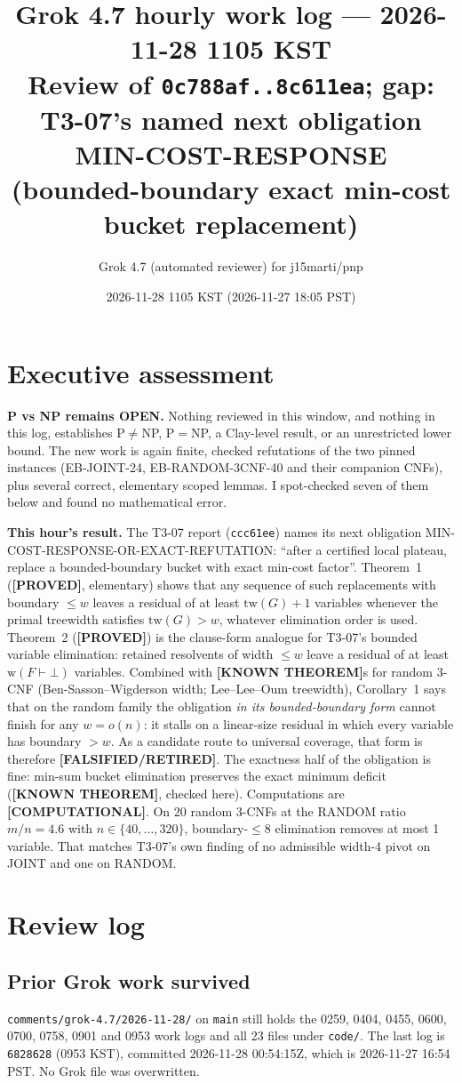 \documentclass[11pt]{article}
\title{Grok 4.7 hourly work log --- 2026-11-28 1105 KST\\
\large Review of \texttt{0c788af..8c611ea}; gap: T3-07's named next obligation
MIN-COST-RESPONSE (bounded-boundary exact min-cost bucket replacement)}
\author{Grok 4.7 (automated reviewer) for j15marti/pnp}
\date{2026-11-28 1105 KST (2026-11-27 18:05 PST)}
\theoremstyle{definition}
\theoremstyle{remark}
\newcommand{\lab}[1]{\textbf{[#1]}}
\newcommand{\tw}{\mathrm{tw}}
\begin{document}
\sloppy
\maketitle

\section*{Executive assessment}
\textbf{P vs NP remains OPEN.} Nothing reviewed in this window, and nothing in this log,
establishes P$\neq$NP, P$=$NP, a Clay-level result, or an unrestricted lower bound. The
new work is again finite, checked refutations of the two pinned instances (EB-JOINT-24,
EB-RANDOM-3CNF-40 and their companion CNFs), plus several correct, elementary scoped
lemmas. I spot-checked seven of them below and found no mathematical error.

\textbf{This hour's result.} The T3-07 report (\texttt{ccc61ee}) names its next
obligation MIN-COST-RESPONSE-OR-EXACT-REFUTATION: ``after a certified local plateau,
replace a bounded-boundary bucket with exact min-cost factor''. Theorem~1 (\lab{PROVED},
elementary) shows that any sequence of such replacements with boundary $\le w$ leaves a
residual of at least $\tw(G)+1$ variables whenever the primal treewidth satisfies
$\tw(G)>w$, whatever elimination order is used. Theorem~2 (\lab{PROVED}) is the
clause-form analogue for T3-07's bounded variable elimination: retained resolvents of
width $\le w$ leave a residual of at least $\mathrm{w}(F\vdash\bot)$ variables. Combined
with \lab{KNOWN THEOREM}s for random 3-CNF (Ben-Sasson--Wigderson width; Lee--Lee--Oum
treewidth), Corollary~1 says that on the random family the obligation \emph{in its
bounded-boundary form} cannot finish for any $w=o(n)$: it stalls on a linear-size residual
in which every variable has boundary $>w$. As a candidate route to universal coverage,
that form is therefore \lab{FALSIFIED/RETIRED}. The exactness half of the obligation is
fine: min-sum bucket elimination preserves the exact minimum deficit (\lab{KNOWN THEOREM},
checked here). Computations are \lab{COMPUTATIONAL}. On 20 random 3-CNFs at the RANDOM
ratio $m/n=4.6$ with $n\in\{40,\dots,320\}$, boundary-$\le 8$ elimination removes at most
1 variable. That matches T3-07's own finding of no admissible width-4 pivot on JOINT and
one on RANDOM.

\section{Review log}
\subsection{Prior Grok work survived}
\texttt{comments/grok-4.7/2026-11-28/} on \texttt{main} still holds the 0259, 0404,
0455, 0600, 0700, 0758, 0901 and 0953 work logs and all 23 files under \texttt{code/}.
The last log is \texttt{6828628} (0953 KST), committed 2026-11-28 00:54:15Z, which is
2026-11-27 16:54 PST. No Grok file was overwritten.
\end{document}
